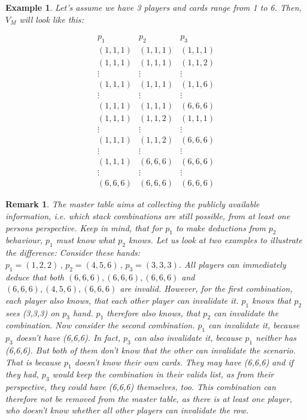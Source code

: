 \documentclass{article}
\newtheorem{remark}{Remark}[section]
\newtheorem{example}{Example}[section]
\begin{document}
\begin{example}

Let's assume we have 3 players and cards range from 1 to 6. Then, $V_{M}$ will look like this:

\begin{equation*}
\begin{array}{ccc}
p_1 & p_2 & p_3 \\ \hline
(1,1,1) & (1,1,1) & (1,1,1) \\
(1,1,1) & (1,1,1) & (1,1,2) \\
\vdots & \vdots & \vdots \\
(1,1,1) & (1,1,1) & (1,1,6) \\
\vdots & \vdots & \vdots \\
(1,1,1) & (1,1,1) & (6,6,6) \\
(1,1,1) & (1,1,2) & (1,1,1) \\
\vdots & \vdots & \vdots \\
(1,1,1) & (1,1,2) & (6,6,6) \\
\vdots & \vdots & \vdots \\
(1,1,1) & (6,6,6) & (6,6,6) \\
\vdots & \vdots & \vdots \\
(6,6,6) & (6,6,6) & (6,6,6)
\end{array} 
\end{equation*}

\end{example}

\begin{remark}

The master table aims at collecting the publicly available information, i.e. which stack combinations are still possible, from at least one persons perspective. Keep in mind, that for $p_1$ to make deductions from $p_2$ behaviour, $p_1$ must know what $p_2$ knows. Let us look at two examples to illustrate the difference: Consider these hands: $p_1 = (1,2,2) \, , \, p_2 = (4,5,6) \, , \, p_3 = (3,3,3)$. All players can immediately deduce that both $(6,6,6), (6,6,6), (6,6,6)$ and $(6,6,6), (4,5,6), (6,6,6)$ are invalid. However, for the first combination, each player also knows, that each other player can invalidate it. $p_1$ knows that $p_2$ sees (3,3,3) on $p_3$ hand. $p_1$ therefore also knows, that $p_2$ can invalidate the combination. Now consider the second combination. $p_1$ can invalidate it, because $p_3$ doesn't have (6,6,6). In fact, $p_3$ can also invalidate it, because $p_1$ neither has (6,6,6). But both of them don't know that the other can invalidate the scenario. That is because $p_1$ doesn't know their own cards. They may have (6,6,6) and if they had, $p_3$ would keep the combination in their valids list, as from their perspective, they could have (6,6,6) themselves, too. This combination can therefore not be removed from the master table, as there is at least one player, who doesn't know whether all other players can invalidate the row. 

\end{remark}
\end{document}
